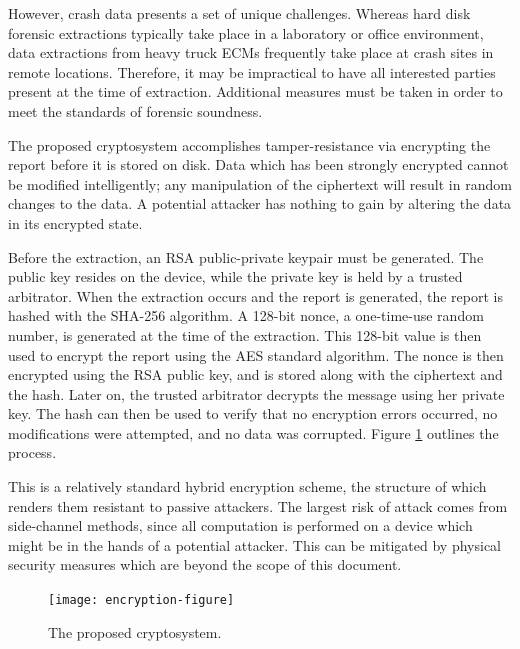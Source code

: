 \documentclass{report}
\begin{document}
However, crash data presents a set of unique challenges. Whereas hard disk forensic extractions typically take place in a laboratory or office environment, data extractions
from heavy truck ECMs frequently take place at crash sites in remote locations. Therefore, it may be impractical to have all interested parties present at the time of extraction.
Additional measures must be taken in order to meet the standards of forensic soundness.

The proposed cryptosystem accomplishes tamper-resistance via encrypting the report before it is stored on disk. Data which has been strongly encrypted cannot be modified intelligently;
any manipulation of the ciphertext will result in random changes to the data\cite{schneier1996}. A potential attacker has nothing to gain by altering the data in its encrypted state.

Before the extraction, an RSA public-private keypair must be generated. The public key resides on the device, while the private key is held by a trusted arbitrator. When the extraction
occurs and the report is generated, the report is hashed with the SHA-256 algorithm.
A 128-bit nonce, a one-time-use random number, is generated at the time of the extraction. This 128-bit value is then used to encrypt the report using the AES standard algorithm.
The nonce is then encrypted using the RSA public key, and is stored along with the ciphertext and the hash. Later on, the trusted arbitrator decrypts the message using her private key.
The hash can then be used to verify that no encryption errors occurred, no modifications were attempted, and no data was corrupted. Figure \ref{fig:cryptosystem} outlines the process.

This is a relatively standard hybrid encryption scheme, the structure of which renders them resistant to passive attackers\cite{cramer2004}. The largest risk of attack
comes from side-channel methods, since all computation is performed on a device which might be in the hands of a potential attacker. This can be mitigated by physical
security measures which are beyond the scope of this document.

\begin{figure}[h]
  \centering
  \texttt{[image: encryption-figure]}
  \caption{The proposed cryptosystem.}
  \label{fig:cryptosystem}
\end{figure}



\end{document}
